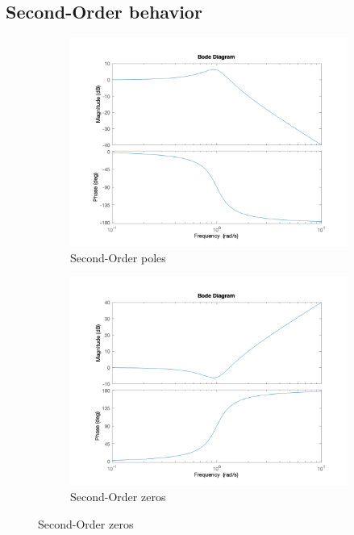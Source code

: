 \subsection*{Second-Order behavior}
\begin{figure}[!h]
  \centering
  \begin{subfigure}[b]{0.45\textwidth}	
	\includegraphics[width=\textwidth]{Images/bode_2nd_order_denom}
	\caption{Second-Order poles}
	\label{fig:bode-2nd-order-pole}
  \end{subfigure}
  \begin{subfigure}[b]{0.45\textwidth}	
	\includegraphics[width=\textwidth]{Images/bode_2nd_order_num}
	\caption{Second-Order zeros}
	\label{fig:bode-2nd-order-zero}
  \end{subfigure}
\end{figure}

